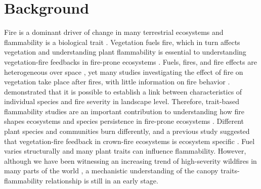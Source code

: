 \documentclass{bmcart}
\begin{document}



\doublespacing

\linenumbers

\section*{Background}
Fire is a dominant driver of change in many terrestrial ecosystems and flammability is a biological trait \citep{pausasandmoi2012flammability}. Vegetation fuels fire, which in turn affects vegetation \citep{bova2005linking, jones2006prediction, kavanagh2010way,o2010acute, michaletz2012moving, west2016experimental, lodge2018xylem, bar2019fire}
and understanding plant flammability is essential to understanding vegetation-fire feedbacks in fire-prone ecosystems \citep{pausas2012fire, pausas2017flammability}. Fuels, fires, and fire effects are heterogeneous over space \citep{gagnon2010does, o2018advances}, yet many studies investigating the effect of fire on vegetation take place after fires, with little information on fire behavior \citep{o2018advances}. \citet{schwilk2011scaling} demonstrated that it is possible to establish a link between characteristics of individual species  and fire severity in landscape level. Therefore, trait-based flammability studies are an important contribution to understanding how fire shapes ecosystems and species persistence in fire-prone ecosystems \citep{pausas2012fire, pausas2017flammability}. Different plant species and communities burn differently, and a previous study suggested that vegetation-fire feedback in crown-fire ecosystems is ecosystem specific \citep{pausas2004plant}. Fuel varies structurally and many plant traits can influence flammability. 
However, although we have been witnessing an increasing trend of high-severity wildfires in many parts of the world \citep{miller2012trends, dennison2014large, weber2020spatiotemporal, salguero2020wildfire}, a mechanistic understanding of the canopy traits-flammability relationship is still in an early stage.
\end{document}
